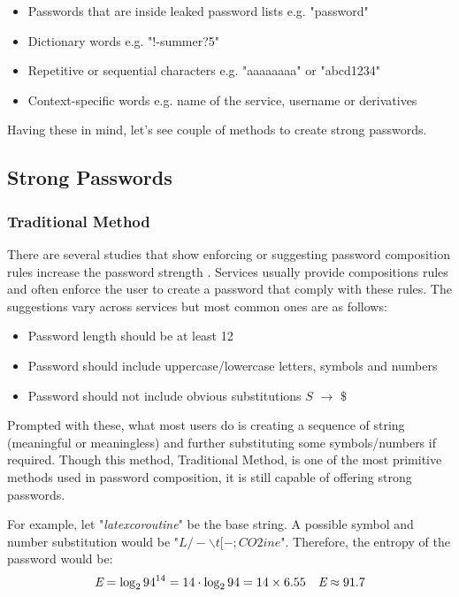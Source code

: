 \documentclass[acmsmall,nonacm]{acmart}
\begin{document}
\begin{itemize}
\item Passwords that are inside leaked password lists e.g. "password" 
\item Dictionary words e.g. "!-summer?5"
\item Repetitive or sequential characters e.g. "aaaaaaaa" or "abcd1234"
\item Context-specific words e.g. name of the service, username or derivatives
\end{itemize}

Having these in mind, let's see couple of methods to create strong passwords.

\subsection{Strong Passwords} \label{strong}

\subsubsection{Traditional Method} \label{creation-traditional}

There are several studies that show enforcing or suggesting password composition rules increase the password strength \cite{shay_2010, shay_2015}. Services usually provide compositions rules and often enforce the user to create a password that comply with these rules. The suggestions vary across services but most common ones are as follows:

\begin{itemize}
\item Password length should be at least 12
\item Password should include uppercase/lowercase letters, symbols and numbers
\item Password should not include obvious substitutions $S$ ${\displaystyle \rightarrow }$ $\$$
\end{itemize}

Prompted with these, what most users do is creating a sequence of string (meaningful or meaningless) and further substituting some symbols/numbers if required. Though this method, Traditional Method, is one of the most primitive methods used in password composition, it is still capable of offering strong passwords.

For example, let "\emph{latexcoroutine}" be the base string. A possible symbol and number substitution would be "$L/-\backslash t[-;CO2ine$". Therefore, the entropy of the password would be:
\begin{align*}
    \emph{E} = \log_2 94^{14} &= 14 \cdot \log_2 94 = 14 \times 6.55 &\emph{E} \approx 91.7
\end{align*}
\end{document}
